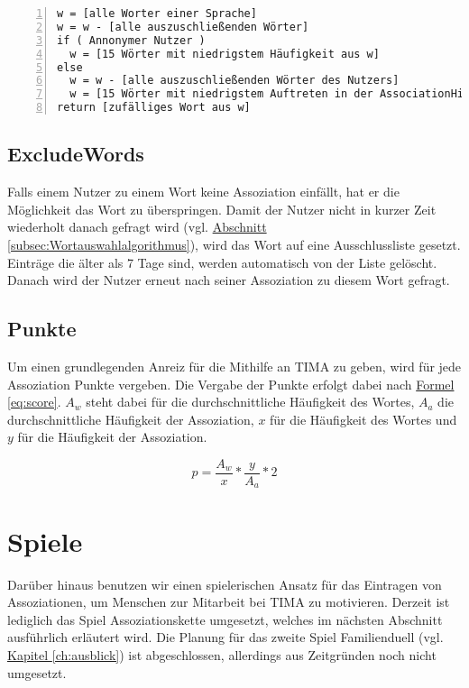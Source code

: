 \medskip
\begin{lstlisting}[basicstyle=\ttfamily,
backgroundcolor=\color{lightgray},
showspaces=false,
showstringspaces=false,
showtabs=false,
columns=fixed,
frame=lines,
numbers=left,
numbersep=5pt,
breaklines=true,
captionpos=b,
label=lst:wortselect,
caption=Wortauswahlalgorithmus]
w = [alle Worter einer Sprache]
w = w - [alle auszuschließenden Wörter]
if ( Annonymer Nutzer )
  w = [15 Wörter mit niedrigstem Häufigkeit aus w]
else
  w = w - [alle auszuschließenden Wörter des Nutzers]
  w = [15 Wörter mit niedrigstem Auftreten in der AssociationHistory des Buntzers1 aus w]
return [zufälliges Wort aus w]
\end{lstlisting}

\subsection{ExcludeWords}\label{subsec:excludewords}
Falls einem Nutzer zu einem Wort keine Assoziation einfällt, hat er die
Möglichkeit das Wort zu überspringen. Damit der Nutzer nicht in kurzer Zeit
wiederholt danach gefragt wird (vgl.
\hyperref[subsec:Wortauswahlalgorithmus]
{Abschnitt \ref*{subsec:Wortauswahlalgorithmus}}), wird das Wort auf eine
Ausschlussliste gesetzt. Einträge die älter als 7 Tage sind, werden
automatisch von der Liste gelöscht. Danach wird der Nutzer erneut nach
seiner Assoziation zu diesem Wort gefragt.

\subsection{Punkte}\label{subsec:punkte}
Um einen grundlegenden Anreiz für die  Mithilfe an TIMA zu geben, wird für jede Assoziation Punkte vergeben. Die Vergabe der Punkte erfolgt dabei nach \hyperref[eq:score]{Formel \ref*{eq:score}}. $ A_w $ steht dabei für die durchschnittliche Häufigkeit des Wortes, $ A_a $ die durchschnittliche Häufigkeit der Assoziation, $ x $ für die Häufigkeit des Wortes und $ y $ für die Häufigkeit der Assoziation.

\begin{equation}\label{eq:score}
p = \frac{A_w}{x} * \frac{y}{A_a} * 2
\end{equation}

\section{Spiele}\label{sec:games}
Darüber hinaus benutzen wir einen spielerischen Ansatz für das Eintragen von Assoziationen, um Menschen zur Mitarbeit bei TIMA zu motivieren. Derzeit ist lediglich das Spiel Assoziationskette umgesetzt, welches im nächsten Abschnitt ausführlich erläutert wird. Die Planung für das zweite Spiel Familienduell (vgl. \hyperref[ch:ausblick]{Kapitel \ref*{ch:ausblick}}) ist abgeschlossen, allerdings aus Zeitgründen noch nicht umgesetzt.

